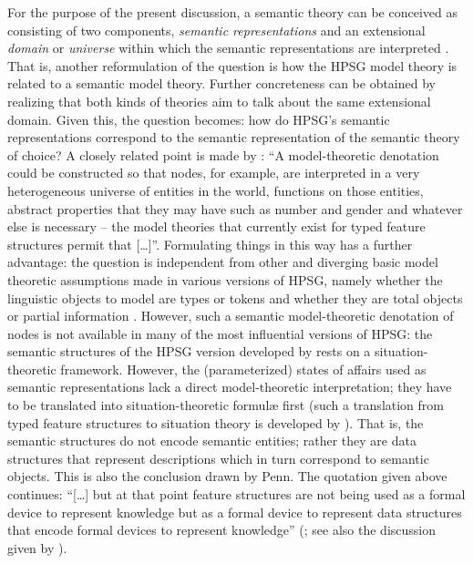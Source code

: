 \documentclass[output=paper,biblatex,babelshorthands,newtxmath,draftmode,colorlinks,citecolor=brown]{langscibook}
\begin{document}
For the purpose of the present discussion, a semantic theory can be conceived as consisting of two components, \emph{semantic representations} and an extensional \emph{domain} or \emph{universe} within which the semantic representations are interpreted \citep{Zimmermann:2011:a,Kempson:2011}. 
%
That is, another reformulation of the question is how the HPSG model theory is related to a semantic model theory.
%
Further concreteness can be obtained by realizing that both kinds of theories aim to talk about the same extensional domain. %
%
 Given this, the question becomes:  how do HPSG's semantic representations correspond to the semantic representation of the semantic theory of choice?
%
A closely related point is made by \citet[]{Penn:2000}: \enquote{A model-theoretic denotation could be constructed so that nodes, for example, are interpreted in a very heterogeneous universe of entities in the world, functions on those entities, abstract properties that they may have such as number and gender and whatever else is necessary -- the model theories that currently exist for typed feature structures permit that [\ldots]}.
%
Formulating things in  this way has a further advantage: the question is independent from other and diverging basic model theoretic assumptions made in various versions of HPSG, namely whether the linguistic objects to model are types \citep{Pollard:Sag:1994} or tokens \citep{Pollard:Sag:1987} and whether they are total objects \citep{Pollard:Sag:1994} or partial information \citep{Carpenter:1992}.
%
However, such a semantic model-theoretic denotation of nodes is not available in many of the most influential versions of HPSG: the semantic structures of the HPSG version developed by \citet{Pollard:Sag:1994} rests on a situation-theoretic framework.
%
However, the (parameterized) states of affairs used as semantic representations lack a direct model-theoretic interpretation; they have to be translated into  situation-theoretic formul{\ae} first (such a translation from typed feature structures to situation theory is developed by \citealp[Section.~3.6]{Ginzburg:Sag:2000}).
%
That is, the semantic structures do not encode semantic entities; rather they are data structures that represent descriptions which in turn correspond to semantic objects.
%
This is also the conclusion drawn by Penn.
%
The quotation given above continues: \enquote{[\ldots] but at that point feature structures are not being used as a formal device to represent knowledge but as a formal device to represent data structures that encode formal devices to represent knowledge} (\citealt[]{Penn:2000}; see also the discussion given by \citealt[Section~5.2.2]{Ginzburg:2012}).
\end{document}
